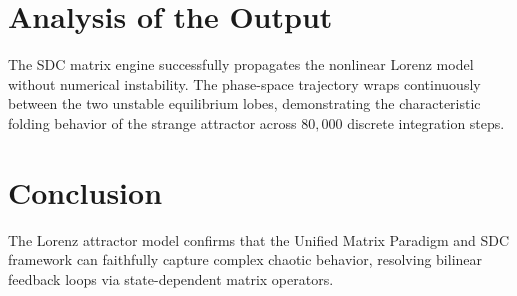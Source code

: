 \section{Analysis of the Output}
The SDC matrix engine successfully propagates the nonlinear Lorenz model without numerical instability. The phase-space trajectory wraps continuously between the two unstable equilibrium lobes, demonstrating the characteristic folding behavior of the strange attractor across $80,000$ discrete integration steps.

\section{Conclusion}
The Lorenz attractor model confirms that the Unified Matrix Paradigm and SDC framework can faithfully capture complex chaotic behavior, resolving bilinear feedback loops via state-dependent matrix operators.